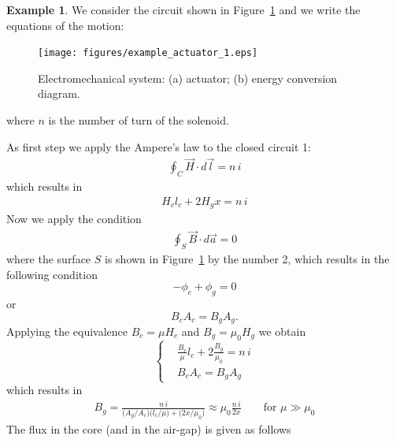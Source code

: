 \documentclass[11pt,a4paper,oneside]{book}
\numberwithin{equation}{section}
\theoremstyle{it}
\theoremstyle{definition}
\newtheorem{example}{Example}[section]
\begin{document}
\begin{example}
	We consider the circuit shown in Figure~\ref{example_actuator_1} and we write the equations of the motion:
	\begin{figure}[H]
		\centering
		\texttt{[image: figures/example\_actuator\_1.eps]}
		\captionsetup{width=0.75\textwidth}		
		\caption{Electromechanical system: (a) actuator; (b) energy conversion diagram.}
		\label{example_actuator_1}
	\end{figure}
where $n$ is the number of turn of the solenoid.

As first step we apply the Ampere's law to the closed circuit 1:
\begin{equation}\label{example_1}	
		\begin{aligned}
		\oint_{C}\vec{H}\cdot d\vec{l}=n\,i
		\end{aligned}
\end{equation} 
which results in 
\begin{equation}\label{example_2}	
	\begin{aligned}
H_cl_c+2H_gx=n\,i
	\end{aligned}
\end{equation} 
Now we apply the condition
\begin{equation}\label{example_3}	
	\begin{aligned}
		\oint_{S}\vec{B}\cdot d\vec{a}=0 %
	\end{aligned}
\end{equation} 
where the surface $S$ is shown in Figure~\ref{example_actuator_1} by the number 2, which results in the following condition $$ -\phi_c+\phi_g=0$$ or $$B_cA_c=B_gA_g. $$ Applying the equivalence $B_c=\mu H_c$ and $B_g=\mu_0 H_g$ we obtain 
\begin{equation}\label{example_4}	
	\left\lbrace 
	\begin{aligned}
		&\frac{B_c}{\mu}l_c+2\frac{B_g}{\mu_0}=n\,i \\[8pt]
		&B_cA_c=B_gA_g
	\end{aligned}
	\right. 
\end{equation} 
which results in
\begin{equation}\label{example_5}	
	\begin{aligned}
		B_g = \frac{n\,i}{\big(A_g/A_c\big)\big(l_c/\mu\big) + \big(2x/\mu_0\big)}\approx\mu_0\frac{n\,i}{2x} \qquad\text{for }\mu\gg\mu_0
	\end{aligned}
\end{equation} 
The flux in the core (and in the air-gap) is given as follows

\end{example}
\end{document}
